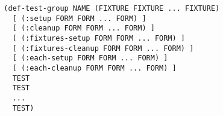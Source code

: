 \begin{verbatim}
  (def-test-group NAME (FIXTURE FIXTURE ... FIXTURE)
    [ (:setup FORM FORM ... FORM) ]
    [ (:cleanup FORM FORM ... FORM) ]
    [ (:fixtures-setup FORM FORM ... FORM) ]
    [ (:fixtures-cleanup FORM FORM ... FORM) ]
    [ (:each-setup FORM FORM ... FORM) ]
    [ (:each-cleanup FORM FORM ... FORM) ]
    TEST
    TEST
    ...
    TEST)
\end{verbatim}
